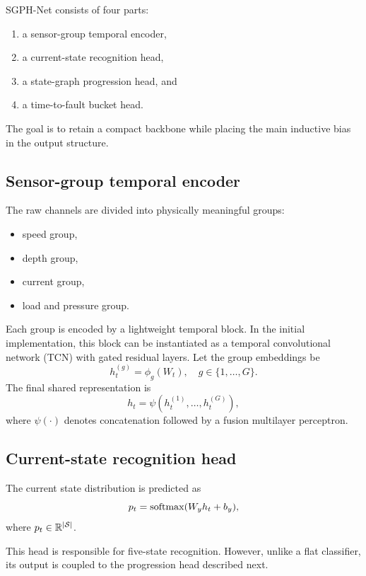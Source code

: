 SGPH-Net consists of four parts:
\begin{enumerate}
\item a sensor-group temporal encoder,
\item a current-state recognition head,
\item a state-graph progression head, and
\item a time-to-fault bucket head.
\end{enumerate}

The goal is to retain a compact backbone while placing the main inductive bias in the output structure.

\subsection{Sensor-group temporal encoder}

The raw channels are divided into physically meaningful groups:
\begin{itemize}
\item speed group,
\item depth group,
\item current group,
\item load and pressure group.
\end{itemize}

Each group is encoded by a lightweight temporal block. In the initial implementation, this block can be instantiated as a temporal convolutional network (TCN) with gated residual layers. Let the group embeddings be
\begin{equation}
h_t^{(g)} = \phi_g(W_t), \quad g \in \{1, \ldots, G\}.
\end{equation}
The final shared representation is
\begin{equation}
h_t = \psi\left(h_t^{(1)}, \ldots, h_t^{(G)}\right),
\end{equation}
where $\psi(\cdot)$ denotes concatenation followed by a fusion multilayer perceptron.

\subsection{Current-state recognition head}

The current state distribution is predicted as
\begin{equation}
p_t = \mathrm{softmax}(W_y h_t + b_y),
\end{equation}
where $p_t \in \mathbb{R}^{|\mathcal{S}|}$.

This head is responsible for five-state recognition. However, unlike a flat classifier, its output is coupled to the progression head described next.

